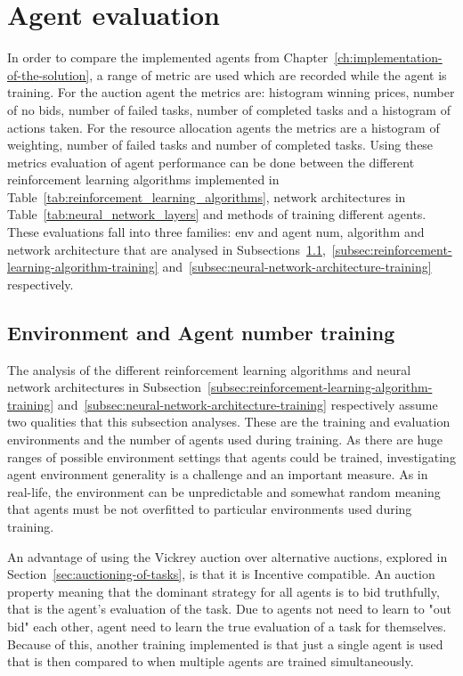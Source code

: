 \section{Agent evaluation}\label{sec:agent-evaluation}
In order to compare the implemented agents from Chapter~\ref{ch:implementation-of-the-solution}, a range of metric are
used which are recorded while the agent is training. For the auction agent the metrics are: histogram winning prices,
number of no bids, number of failed tasks, number of completed tasks and a histogram of actions taken. For the resource
allocation agents the metrics are a histogram of weighting, number of failed tasks and number of completed tasks.
Using these metrics evaluation of agent performance can be done between the different reinforcement learning algorithms
implemented in Table~\ref{tab:reinforcement_learning_algorithms}, network architectures in
Table~\ref{tab:neural_network_layers} and methods of training different agents. \\
These evaluations fall into three families: env and agent num, algorithm and network architecture that are analysed in
Subsections~\ref{subsec:environment-and-agent-number-training},~\ref{subsec:reinforcement-learning-algorithm-training}
and~\ref{subsec:neural-network-architecture-training} respectively.

\subsection{Environment and Agent number training}\label{subsec:environment-and-agent-number-training}
The analysis of the different reinforcement learning algorithms and neural network architectures in
Subsection~\ref{subsec:reinforcement-learning-algorithm-training} and~\ref{subsec:neural-network-architecture-training}
respectively assume two qualities that this subsection analyses. These are the training and evaluation environments
and the number of agents used during training. As there are huge ranges of possible environment settings that agents
could be trained, investigating agent environment generality is a challenge and an important measure. As in real-life,
the environment can be unpredictable and somewhat random meaning that agents must be not overfitted to particular
environments used during training.

An advantage of using the Vickrey auction over alternative auctions, explored in Section~\ref{sec:auctioning-of-tasks},
is that it is Incentive compatible. An auction property meaning that the dominant strategy for all agents is to bid
truthfully, that is the agent's evaluation of the task. Due to agents not need to learn to "out bid" each other, agent
need to learn the true evaluation of a task for themselves. Because of this, another training implemented is that just
a single agent is used that is then compared to when multiple agents are trained simultaneously.

